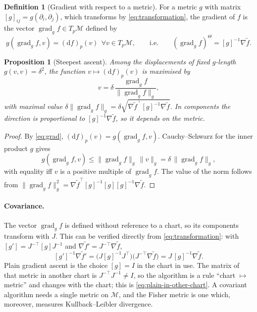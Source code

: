 \documentclass[11pt,a4paper]{article}
\numberwithin{equation}{section}
\theoremstyle{plain}
\newtheorem{proposition}[theorem]{Proposition}
\theoremstyle{definition}
\newtheorem{definition}[theorem]{Definition}
\theoremstyle{remark}
\newcommand{\T}{^{\top}}
\newcommand{\dd}{\mathrm{d}}
\DeclareMathOperator{\grad}{grad}
\newcommand{\mani}{\mathcal{M}}
\begin{document}
\begin{definition}[Gradient with respect to a metric]\label{def:grad}
For a metric $g$ with matrix $[g]_{ij}=g(\partial_i,\partial_j)$, which transforms by \eqref{eq:transformation}, the gradient of $f$ is the vector $\grad_gf\in T_p\mani$ defined by
\begin{equation}\label{eq:grad}
  g(\grad_gf,v)=(\dd f)_p(v)\ \ \forall v\in T_p\mani,
  \qquad\text{i.e.}\qquad
  (\grad_gf)^\Theta=[g]^{-1}\nabla\tilde f .
\end{equation}
\end{definition}

\begin{proposition}[Steepest ascent]\label{prop:steepest}
Among the displacements of fixed $g$-length $g(v,v)=\delta^2$, the function $v\mapsto(\dd f)_p(v)$ is maximised by
\[
  v=\delta\,\frac{\grad_gf}{\|\grad_gf\|_g},
\]
with maximal value $\delta\|\grad_gf\|_g=\delta\sqrt{\nabla\tilde f\T[g]^{-1}\nabla\tilde f}$. In components the direction is proportional to $[g]^{-1}\nabla\tilde f$, so it depends on the metric.
\end{proposition}

\begin{proof}
By \eqref{eq:grad}, $(\dd f)_p(v)=g(\grad_gf,v)$. Cauchy--Schwarz for the inner product $g$ gives
\[
  g(\grad_gf,v)\le\|\grad_gf\|_g\,\|v\|_g=\delta\,\|\grad_gf\|_g,
\]
with equality iff $v$ is a positive multiple of $\grad_gf$. The value of the norm follows from $\|\grad_gf\|_g^2=\nabla\tilde f\T[g]^{-1}[g][g]^{-1}\nabla\tilde f$.
\end{proof}

\paragraph{Covariance.}
The vector $\grad_gf$ is defined without reference to a chart, so its components transform with $J$. This can be verified directly from \eqref{eq:transformation}: with $[g']=J^{-\top}[g]J^{-1}$ and $\nabla\tilde f'=J^{-\top}\nabla\tilde f$,
\begin{equation}\label{eq:covariance}
  [g']^{-1}\nabla\tilde f'=\bigl(J[g]^{-1}J\T\bigr)\bigl(J^{-\top}\nabla\tilde f\bigr)=J\,[g]^{-1}\nabla\tilde f .
\end{equation}
Plain gradient ascent is the choice $[g]=I$ in the chart in use. The matrix of that metric in another chart is $J^{-\top}J^{-1}\ne I$, so the algorithm is a rule ``chart $\mapsto$ metric'' and
changes with the chart; this is \eqref{eq:plain-in-other-chart}. A covariant algorithm needs a single metric on $\mani$, and the Fisher metric is one which, moreover, measures
Kullback--Leibler divergence.
\end{document}
